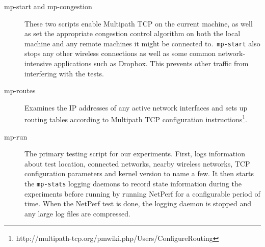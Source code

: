 \begin{description}
  \item[mp-start and mp-congestion]
    These two scripts enable Multipath TCP on the current machine, as well as
    set the appropriate congestion control algorithm on both the local machine
    and any remote machines it might be connected to.\ \texttt{mp-start} also
    stops any other wireless connections as well as some common
    network-intensive applications such as Dropbox. This prevents other traffic
    from interfering with the tests.
  \item[mp-routes]
    Examines the IP addresses of any active network interfaces and sets up
    routing tables according to Multipath TCP configuration
    instructions\footnote{http://multipath-tcp.org/pmwiki.php/Users/ConfigureRouting}.
  \item[mp-run]
    The primary testing script for our experiments. First, logs information
    about test location, connected networks, nearby wireless networks, TCP
    configuration parameters and kernel version to name a few. It then starts
    the \texttt{mp-stats} logging daemons to record state information during the
    experiments before running by running NetPerf for a configurable period of
    time. When the NetPerf test is done, the logging daemon is stopped and any
    large log files are compressed.


\end{description}
